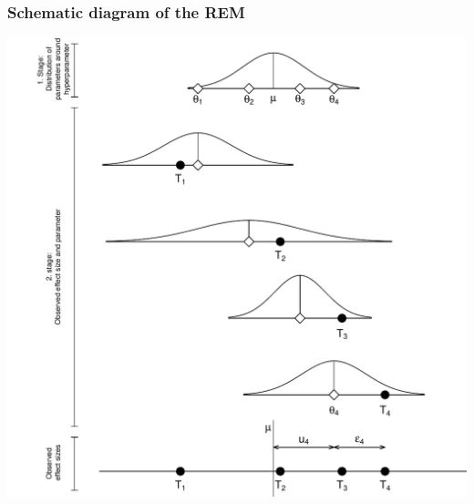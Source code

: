 \documentclass{beamer}\usepackage[]{graphicx}\usepackage[]{color}
\newenvironment{knitrout}{}{} %
\begin{document}
\begin{frame}[label=diagram_rem]
  \frametitle{Schematic diagram of the REM}


  
\begin{knitrout}
\color{fgcolor}
\includegraphics[width=.7\linewidth]{fig/fem_rem_scheme-1} 

\end{knitrout}
\end{frame}
\end{document}
